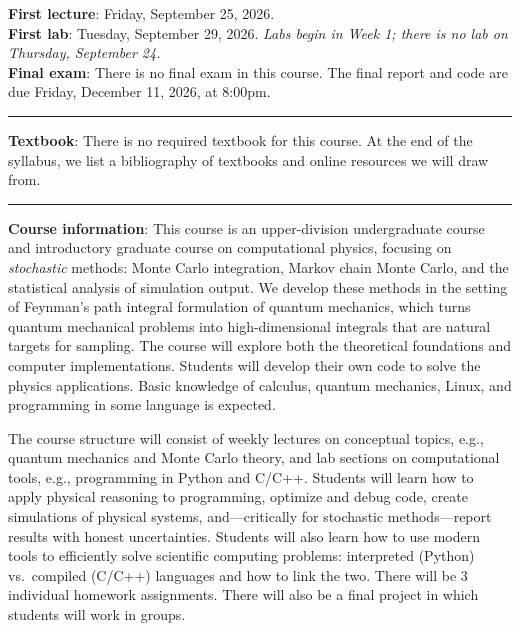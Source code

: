 \documentclass[12pt]{article}
\begin{document}
\noindent\textbf{First lecture}: Friday, September 25, 2026.\\
\textbf{First lab}: Tuesday, September 29, 2026. \emph{Labs begin in Week 1; there is no lab on Thursday, September 24.}\\

\noindent\textbf{Final exam}: There is no final exam in this course. The final report and code are due Friday, December 11, 2026, at 8:00pm.

\begin{center}
  \rule{\textwidth}{0.5pt}
\end{center}

\noindent\textbf{Textbook}: There is no required textbook for this course.
At the end of the syllabus, we list a bibliography of textbooks and online resources we will draw from.

\begin{center}
  \rule{\textwidth}{0.5pt}
\end{center}

\noindent\textbf{Course information}: This course is an upper-division undergraduate course and introductory graduate course on computational physics, focusing on \emph{stochastic} methods: Monte Carlo integration, Markov chain Monte Carlo, and the statistical analysis of simulation output.
We develop these methods in the setting of Feynman's path integral formulation of quantum mechanics, which turns quantum mechanical problems into high-dimensional integrals that are natural targets for sampling.
The course will explore both the theoretical foundations and computer implementations.
Students will develop their own code to solve the physics applications.
Basic knowledge of calculus, quantum mechanics, Linux, and programming in some language is expected.

The course structure will consist of weekly lectures on conceptual topics, e.g., quantum mechanics and Monte Carlo theory, and lab sections on computational tools, e.g., programming in Python and C/C++.
Students will learn how to apply physical reasoning to programming, optimize and debug code, create simulations of physical systems, and---critically for stochastic methods---report results with honest uncertainties.
Students will also learn how to use modern tools to efficiently solve scientific computing problems: interpreted (Python) vs.\ compiled (C/C++) languages and how to link the two.
There will be 3 individual homework assignments.
There will also be a final project in which students will work in groups.
\end{document}
